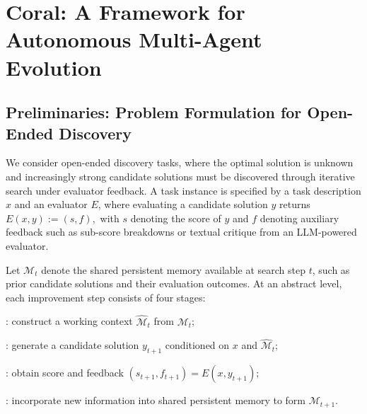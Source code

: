 
\section{Coral: A Framework for Autonomous Multi-Agent Evolution}
\subsection{Preliminaries: Problem Formulation for Open-Ended Discovery}
\label{Sec:method:preliminary}

We consider open-ended discovery tasks, where the optimal solution is unknown and increasingly strong candidate solutions must be discovered through iterative search under evaluator feedback. A task instance is specified by a task description $x$ and an evaluator $E$, where evaluating a candidate solution $y$ returns $E(x,y) := (s,f),$ with $s$ denoting the score of $y$ and $f$ denoting auxiliary feedback such as sub-score breakdowns or textual critique from an LLM-powered evaluator.

Let $\mathcal{M}_t$ denote the shared persistent memory available at search step $t$, such as prior candidate solutions and their evaluation outcomes. At an abstract level, each improvement step consists of four stages:
\squishlisttwo[\arabic*.]
    \item {}: construct a working context $\hat{\mathcal{M}}_t$ from $\mathcal{M}_t$;
    \item {}: generate a candidate solution $y_{t+1}$ conditioned on $x$ and $\hat{\mathcal{M}}_t$;
    \item {}: obtain score and feedback $(s_{t+1}, f_{t+1}) = E(x, y_{t+1})$;
    \item {}: incorporate new information into shared persistent memory to form $\mathcal{M}_{t+1}$.
\squishend

